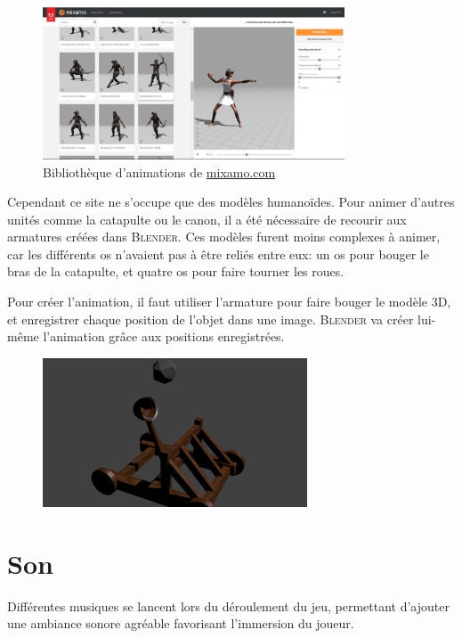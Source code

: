 \documentclass[12pt]{report}
\begin{document}
\begin{figure}[H]
    \centering
    \includegraphics[width=0.8\textwidth]{mixamo}
    \caption*{Bibliothèque d'animations de \url{mixamo.com}}
\end{figure}

Cependant ce site ne s’occupe que des modèles humanoïdes. Pour animer d’autres
unités comme la catapulte ou le canon, il a été nécessaire de recourir aux
armatures créées dans \textsc{Blender}. Ces modèles furent moins complexes à
animer, car les différents os n’avaient pas à être reliés entre eux: un os pour
bouger le bras de la catapulte, et quatre os pour faire tourner les roues.

Pour créer l’animation, il faut utiliser l’armature pour faire bouger le modèle
3D, et enregistrer chaque position de l’objet dans une image. \textsc{Blender}
va créer lui-même l’animation grâce aux positions enregistrées.

\begin{figure}[H]
    \centering
    \includegraphics[width=0.7\textwidth]{catapult}
\end{figure}

\section{Son}

Différentes musiques se lancent lors du déroulement du jeu, permettant d’ajouter
une ambiance sonore agréable favorisant l’immersion du joueur.
\end{document}
